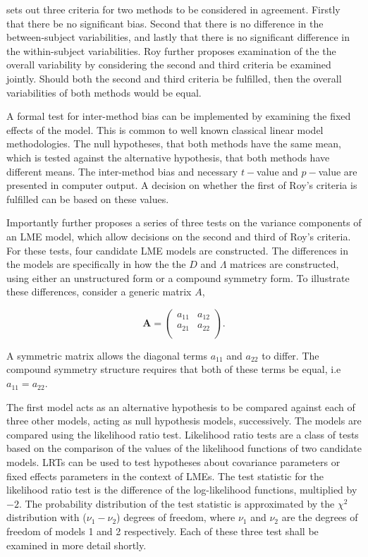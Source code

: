 \documentclass[12pt, a4paper]{report}
\theoremstyle{plain}
\theoremstyle{definition}
\theoremstyle{remark}
\begin{document}
	\citet{ARoy2009} sets out three criteria for two methods to be considered in agreement. Firstly that there be no significant bias. Second that there is no difference in the between-subject variabilities, and lastly that there is no significant difference in the within-subject variabilities. Roy further proposes examination of the the overall variability by considering the second and third criteria be examined jointly. Should both the second and third criteria be fulfilled, then the overall variabilities of both methods would be equal.
		
		A formal test for inter-method bias can be implemented by examining the fixed effects of the model. This is common to well known classical linear model methodologies. The null hypotheses, that both methods have the same mean, which is tested against the alternative hypothesis, that both methods have different means.
		The inter-method bias and necessary $t-$value and $p-$value are presented in computer output. A decision on whether the first of Roy's criteria is fulfilled can be based on these values.
		
		Importantly \citet{ARoy2009} further proposes a series of three tests on the variance components of an LME model, which allow decisions on the second and third of Roy's criteria. For these tests, four candidate LME models are constructed. The differences in the models are specifically in how the the $D$ and $\Lambda$ matrices are constructed, using either an unstructured form or a compound symmetry form. To illustrate these differences, consider a generic matrix $A$,
		
		\[
		\boldsymbol{A} = \left( \begin{array}{cc}
		a_{11} & a_{12}  \\
		a_{21} & a_{22}  \\
		\end{array}\right).
		\]
		
		A symmetric matrix allows the diagonal terms $a_{11}$ and $a_{22}$ to differ. The compound symmetry structure requires that both of these terms be equal, i.e $a_{11} = a_{22}$.
		
		The first model acts as an alternative hypothesis to be compared against each of three other models, acting as null hypothesis models, successively. The models are compared using the likelihood ratio test. Likelihood ratio tests are a class of tests based on the comparison of the values of the likelihood functions of two candidate models. LRTs can be used to test hypotheses about covariance parameters or fixed effects parameters in the context of LMEs. The test statistic for the likelihood ratio test is the difference of the log-likelihood functions, multiplied by $-2$.
		The probability distribution of the test statistic is approximated by the $\chi^2$ distribution with ($\nu_{1} - \nu_{2}$) degrees of freedom, where $\nu_{1}$ and $\nu_{2}$ are the degrees of freedom of models 1 and 2 respectively. Each of these three test shall be examined in more detail shortly.
		
\end{document}

